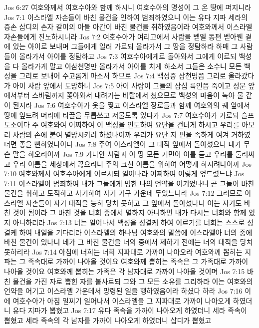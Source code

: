 Jos 6:27  여호와께서 여호수아와 함께 하시니 여호수아의 명성이 그 온 땅에 퍼지니라
Jos 7:1  이스라엘 자손들이 바친 물건을 인하여 범죄하였으니 이는 유다 지파 세라의 증손 삽디의 손자 갈미의 아들 아간이 바친 물건을 취하였음이라 여호와께서 이스라엘 자손들에게 진노하시니라
Jos 7:2  여호수아가 여리고에서 사람을 벧엘 동편 벧아웬 곁에 있는 아이로 보내며 그들에게 일러 가로되 올라가서 그 땅을 정탐하라 하매 그 사람들이 올라가서 아이를 정탐하고
Jos 7:3  여호수아에게로 돌아와서 그에게 이르되 백성을 다 올라가게 말고 이삼천명만 올라가서 아이를 치게 하소서 그들은 소수니 모든 백성을 그리로 보내어 수고롭게 마소서 하므로
Jos 7:4  백성중 삼천명쯤 그리로 올라갔다가 아이 사람 앞에서 도망하니
Jos 7:5  아이 사람이 그들의 삼십 륙인쯤 죽이고 성문 앞에서부터 스바림까지 쫓아와서 내려가는 비탈에서 쳤으므로 백성의 마음이 녹아 물 같이 된지라
Jos 7:6  여호수아가 옷을 찢고 이스라엘 장로들과 함께 여호와의 궤 앞에서 땅에 엎드려 머리에 티끌을 무릅쓰고 저물도록 있다가
Jos 7:7  여호수아가 가로되 슬프도소이다 주 여호와여 어찌하여 이 백성을 인도하여 요단을 건너게 하시고 우리를 아모리 사람의 손에 붙여 멸망시키려 하셨나이까 우리가 요단 저 편을 족하게 여겨 거하였더면 좋을 뻔하였나이다
Jos 7:8  주여 이스라엘이 그 대적 앞에서 돌아섰으니 내가 무슨 말을 하오리이까
Jos 7:9  가나안 사람과 이 땅 모든 거민이 이를 듣고 우리를 둘러싸고 우리 이름을 세상에서 끊으리니 주의 크신 이름을 위하여 어떻게 하시려나이까
Jos 7:10  여호와께서 여호수아에게 이르시되 일어나라 어찌하여 이렇게 엎드렸느냐
Jos 7:11  이스라엘이 범죄하여 내가 그들에게 명한 나의 언약을 어기었나니 곧 그들이 바친 물건을 취하고 도적하고 사기하여 자기 기구 가운데 두었느니라
Jos 7:12  그러므로 이스라엘 자손들이 자기 대적을 능히 당치 못하고 그 앞에서 돌아섰나니 이는 자기도 바친 것이 됨이라 그 바친 것을 너희 중에서 멸하지 아니하면 내가 다시는 너희와 함께 있지 아니하리라
Jos 7:13  너는 일어나서 백성을 성결케 하여 이르기를 너희는 스스로 성결케 하여 내일을 기다리라 이스라엘의 하나님 여호와의 말씀에 이스라엘아 너의 중에 바친 물건이 있나니 네가 그 바친 물건을 너의 중에서 제하기 전에는 너의 대적을 당치 못하리라
Jos 7:14  아침에 너희는 너희 지파대로 가까이 나아오라 여호와께 뽑히는 지파는 그 족속대로 가까이 나아올 것이요 여호와께 뽑히는 족속은 그 가족대로 가까이 나아올 것이요 여호와께 뽑히는 가족은 각 남자대로 가까이 나아올 것이며
Jos 7:15  바친 물건을 가진 자로 뽑힌 자를 불사르되 그와 그 모든 소유를 그리하라 이는 여호와의 언약을 어기고 이스라엘 가운데서 망령된 일을 행하였음이라 하셨다 하라
Jos 7:16  이에 여호수아가 아침 일찌기 일어나서 이스라엘을 그 지파대로 가까이 나아오게 하였더니 유다 지파가 뽑혔고
Jos 7:17  유다 족속을 가까이 나아오게 하였더니 세라 족속이 뽑혔고 세라 족속의 각 남자를 가까이 나아오게 하였더니 삽디가 뽑혔고
